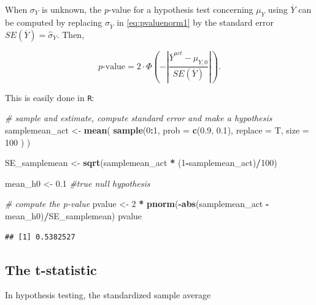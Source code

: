 \documentclass[]{book}
\newenvironment{Shaded}{\begin{snugshade}}{\end{snugshade}}
\newcommand{\KeywordTok}[1]{\textcolor[rgb]{0.13,0.29,0.53}{\textbf{#1}}}
\newcommand{\DataTypeTok}[1]{\textcolor[rgb]{0.13,0.29,0.53}{#1}}
\newcommand{\DecValTok}[1]{\textcolor[rgb]{0.00,0.00,0.81}{#1}}
\newcommand{\FloatTok}[1]{\textcolor[rgb]{0.00,0.00,0.81}{#1}}
\newcommand{\StringTok}[1]{\textcolor[rgb]{0.31,0.60,0.02}{#1}}
\newcommand{\CommentTok}[1]{\textcolor[rgb]{0.56,0.35,0.01}{\textit{#1}}}
\newcommand{\OperatorTok}[1]{\textcolor[rgb]{0.81,0.36,0.00}{\textbf{#1}}}
\newcommand{\NormalTok}[1]{#1}
\theoremstyle{definition}
\theoremstyle{definition}
\theoremstyle{definition}
\theoremstyle{remark}
\begin{document}
When \(\sigma_Y\) is unknown, the \(p\)-value for a hypothesis test
concerning \(\mu_Y\) using \(\overline{Y}\) can be computed by replacing
\(\sigma_{\overline{Y}}\) in \eqref{eq:pvaluenorm1} by the standard error
\(SE(\overline{Y}) = \hat\sigma_Y\). Then,

\[ p\text{-value} = 2\cdot\Phi\left(-\left\lvert \frac{\overline{Y}^{act}-\mu_{Y,0}}{SE(\overline{Y})} \right\rvert \right). \]

This is easily done in \texttt{R}:

\begin{Shaded}
\begin{Highlighting}[]
\CommentTok{# sample and estimate, compute standard error and make a hypothesis}
\NormalTok{samplemean_act <-}\StringTok{ }\KeywordTok{mean}\NormalTok{(}
  \KeywordTok{sample}\NormalTok{(}\DecValTok{0}\OperatorTok{:}\DecValTok{1}\NormalTok{, }
         \DataTypeTok{prob =} \KeywordTok{c}\NormalTok{(}\FloatTok{0.9}\NormalTok{, }\FloatTok{0.1}\NormalTok{), }
         \DataTypeTok{replace =}\NormalTok{ T, }
         \DataTypeTok{size =} \DecValTok{100}
\NormalTok{         )}
\NormalTok{  )}

\NormalTok{SE_samplemean <-}\StringTok{ }\KeywordTok{sqrt}\NormalTok{(samplemean_act }\OperatorTok{*}\StringTok{ }\NormalTok{(}\DecValTok{1}\OperatorTok{-}\NormalTok{samplemean_act)}\OperatorTok{/}\DecValTok{100}\NormalTok{)}

\NormalTok{mean_h0 <-}\StringTok{ }\FloatTok{0.1} \CommentTok{#true null hypothesis}

\CommentTok{# compute the p-value}
\NormalTok{pvalue <-}\StringTok{ }\DecValTok{2} \OperatorTok{*}\StringTok{ }\KeywordTok{pnorm}\NormalTok{(}\OperatorTok{-}\KeywordTok{abs}\NormalTok{(samplemean_act }\OperatorTok{-}\StringTok{ }\NormalTok{mean_h0)}\OperatorTok{/}\NormalTok{SE_samplemean)}
\NormalTok{pvalue}
\end{Highlighting}
\end{Shaded}

\begin{verbatim}
## [1] 0.5382527
\end{verbatim}

\subsection*{The t-statistic}\label{the-t-statistic}

In hypothesis testing, the standardized sample average
\end{document}
